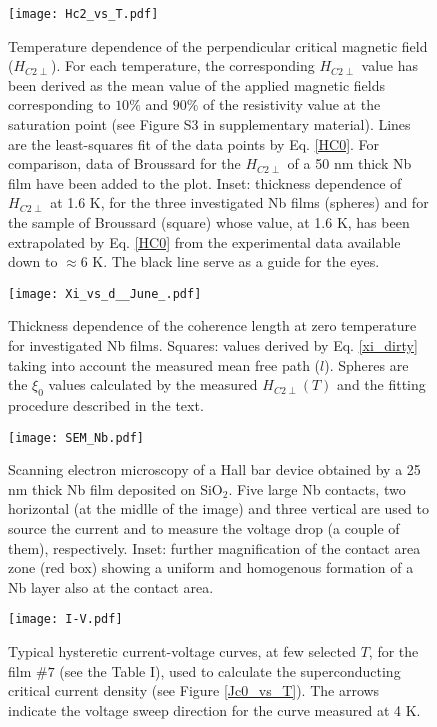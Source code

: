 \documentclass[reprint,onecolumn,superscriptaddress,a4paper,nofootinbib,floatfix]{revtex4-1}
\begin{document}
\begin{figure}[ht]
\centering
\texttt{[image: Hc2\_vs\_T.pdf]}
\caption{Temperature dependence of the perpendicular critical magnetic field ($H_{C2\perp}$). For each temperature, the corresponding $H_{C2\perp}$ value has been derived as the mean value of the applied magnetic fields corresponding to $10\%$ and $90\%$ of the resistivity value at the saturation point (see Figure S3 in supplementary material). Lines are the least-squares fit of the data points by Eq. \eqref{HC0}.
For comparison, data of Broussard\cite{Broussard} for the $H_{C2\perp}$ of a 50 nm thick Nb film have been added to the plot.
Inset: thickness dependence of $H_{C2\perp}$ at 1.6 K, for the three investigated Nb films (spheres) and for the sample of Broussard\cite{Broussard} (square) whose value, at 1.6 K, has been extrapolated by Eq. \eqref{HC0} from the experimental data available down to $\approx 6$ K. The black line serve as a guide for the eyes.}  
\label{Hc2}
\end{figure}

\begin{figure}[h]
\centering
\texttt{[image: Xi\_vs\_d\_\_June\_.pdf]}
\caption{Thickness dependence of the coherence length at zero temperature for investigated Nb films. Squares: values derived by Eq. \eqref{xi_dirty} taking into account the measured mean free path ($l$). Spheres are the $\xi_0$ values calculated by the measured $H_{C2\perp}(T)$ and the fitting procedure described in the text.} 
\label{xi}
\end{figure}

\begin{figure}[ht]
\renewcommand{\thefigure}{S\arabic{figure}}

\centering
\texttt{[image: SEM\_Nb.pdf]}
\caption{Scanning electron microscopy of a Hall bar device obtained by a 25 nm thick Nb film deposited on SiO$_2$. Five large Nb contacts, two horizontal (at the midlle of the image) and three vertical are used to source the current and to measure the voltage drop (a couple of them), respectively. Inset: further magnification of the contact area zone (red box) showing a uniform and homogenous formation of a Nb layer also at the contact area.}
\label{SEM}
\end{figure}

\begin{figure}[ht]
\renewcommand{\thefigure}{S\arabic{figure}}
\centering
\texttt{[image: I-V.pdf]}
\caption{Typical hysteretic current-voltage curves, at few selected $T$, for the film $\#7$ (see the Table I), used to calculate the superconducting critical current density (see Figure \ref{Jc0_vs_T}).  The arrows indicate the voltage sweep direction for the curve measured at 4 K.}  
\label{I-V}
\end{figure}
\end{document}
